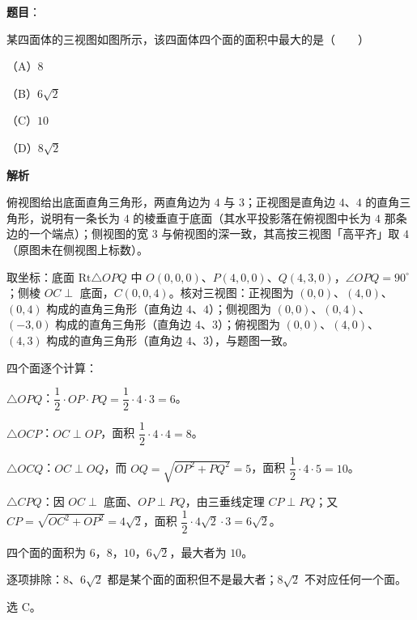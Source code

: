 \begin{answer}

\textbf{题目}：

某四面体的三视图如图所示，该四面体四个面的面积中最大的是\mbox{（　　）}

（A）$8$

（B）$6\sqrt2$

（C）$10$

（D）$8\sqrt2$
\nopagebreak[4]
\begin{center}\end{center}
\nopagebreak[4]
\textbf{解析}

俯视图给出底面直角三角形，两直角边为 $4$ 与 $3$；正视图是直角边 $4$、$4$ 的直角三角形，说明有一条长为 $4$ 的棱垂直于底面（其水平投影落在俯视图中长为 $4$ 那条边的一个端点）；侧视图的宽 $3$ 与俯视图的深一致，其高按三视图「高平齐」取 $4$（原图未在侧视图上标数）。

取坐标：底面 $\mathrm{Rt}\triangle OPQ$ 中 $O(0,0,0)$、$P(4,0,0)$、$Q(4,3,0)$，$\angle OPQ=90^\circ$；侧棱 $OC\perp$ 底面，$C(0,0,4)$。核对三视图：正视图为 $(0,0)$、$(4,0)$、$(0,4)$ 构成的直角三角形（直角边 $4$、$4$）；侧视图为 $(0,0)$、$(0,4)$、$(-3,0)$ 构成的直角三角形（直角边 $4$、$3$）；俯视图为 $(0,0)$、$(4,0)$、$(4,3)$ 构成的直角三角形（直角边 $4$、$3$），与题图一致。

四个面逐个计算：

$\triangle OPQ$：$\dfrac12\cdot OP\cdot PQ=\dfrac12\cdot4\cdot3=6$。

$\triangle OCP$：$OC\perp OP$，面积 $\dfrac12\cdot4\cdot4=8$。

$\triangle OCQ$：$OC\perp OQ$，而 $OQ=\sqrt{OP^2+PQ^2}=5$，面积 $\dfrac12\cdot4\cdot5=10$。

$\triangle CPQ$：因 $OC\perp$ 底面、$OP\perp PQ$，由三垂线定理 $CP\perp PQ$；又 $CP=\sqrt{OC^2+OP^2}=4\sqrt2$，面积 $\dfrac12\cdot4\sqrt2\cdot3=6\sqrt2$。

四个面的面积为 $6$，$8$，$10$，$6\sqrt2$，最大者为 $10$。

逐项排除：$8$、$6\sqrt2$ 都是某个面的面积但不是最大者；$8\sqrt2$ 不对应任何一个面。

选 C。


\end{answer}
